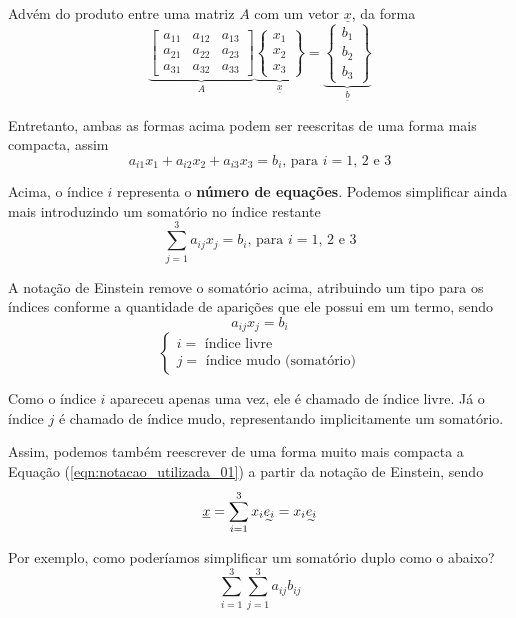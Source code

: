     Advém do produto entre uma matriz $A$ com um vetor $\underline{x}$, da forma
    \[
        \underbrace{
            \begin{bmatrix} 
            	a_{11} & a_{12} & a_{13} \\
            	a_{21} & a_{22} & a_{23} \\
            	a_{31} & a_{32} & a_{33}
    	    \end{bmatrix}
    	}_{\displaystyle A}
    	\underbrace{
        	\begin{Bmatrix} 
                x_1 \\ x_2 \\ x_3
            \end{Bmatrix}
        }_{\displaystyle\underline{x}}
        =
        \underbrace{
            \begin{Bmatrix} 
                b_1 \\ b_2 \\ b_3
            \end{Bmatrix}
        }_{\displaystyle\underline{b}}
    \]
    
    Entretanto, ambas as formas acima podem ser reescritas de uma forma mais compacta, assim
    \[a_{i1}x_1+a_{i2}x_2+a_{i3}x_3=b_i\text{, para $i=1$, $2$ e $3$}\]
    
    Acima, o índice $i$ representa o \textbf{número de equações}. Podemos simplificar ainda mais introduzindo um somatório no índice restante
    \[\sum_{j=1}^3a_{ij}x_j=b_i\text{, para $i=1$, $2$ e $3$}\]
    
    A notação de Einstein remove o somatório acima, atribuindo um tipo para os índices conforme a quantidade de aparições que ele possui em um termo, sendo
    \[a_{ij}x_j=b_i\]
    \[
        \begin{cases}
            i=\text{ índice livre}\\
            j=\text{ índice mudo (somatório)}
        \end{cases}
    \]
    
    Como o índice $i$ apareceu apenas uma vez, ele é chamado de índice livre. Já o índice $j$ é chamado de índice mudo, representando implicitamente um somatório.
    
    Assim, podemos também reescrever de uma forma muito mais compacta a Equação (\ref{eqn:notacao_utilizada_01}) a partir da notação de Einstein, sendo
    \[\underline{x}=\sum_{i=1}^3x_i\undertilde{e_i}=x_i\undertilde{e_i}\]
    
    Por exemplo, como poderíamos simplificar um somatório duplo como o abaixo?
    \[\sum_{i=1}^3\sum_{j=1}^3a_{ij}b_{ij}\]
    

